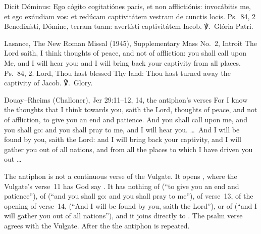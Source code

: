 
\begin{latinproper}
Dicit Dóminus: Ego cógito cogitatiónes pacis, et non afflictiónis:
invocábitis me, et ego exáudiam vos: et redúcam captivitátem vestram de
cunctis locis. \textnormal{Ps.\ 84, 2} Benedixísti, Dómine, terram tuam:
avertísti captivitátem Iacob. ℣.~Glória Patri.
\end{latinproper}

\begin{englishwitness}{Lasance, The New Roman Missal (1945), Supplementary Mass No.~2, Introit}
The Lord saith, I think thoughts of peace, and not of affliction: you shall
call upon Me, and I will hear you; and I will bring back your captivity from
all places. Ps.~84, 2. Lord, Thou hast blessed Thy land: Thou hast turned away
the captivity of Jacob. ℣.~Glory.
\end{englishwitness}

\begin{englishwitness}{Douay--Rheims (Challoner), Jer 29:11--12, 14, the antiphon's verses}
For I know the thoughts that I think towards you, saith the Lord, thoughts of
peace, and not of affliction, to give you an end and patience. And you shall
call upon me, and you shall go: and you shall pray to me, and I will hear you.
\dots\ And I will be found by you, saith the Lord: and I will bring back your
captivity, and I will gather you out of all nations, and from all the places
to which I have driven you out \dots
\end{englishwitness}

\noindent The antiphon is not a continuous verse of the Vulgate. It opens
, where the Vulgate's verse~11 has God say . It has nothing
of  (``to give you an end and
patience''), of  (``and you shall go: and you
shall pray to me''), of verse~13, of the opening of verse~14,  (``And I will be found by you, saith the
Lord''), or of  (``and I will
gather you out of all nations''), and it joins
 directly to . The
psalm verse agrees with the Vulgate. After the  the
antiphon is repeated.

